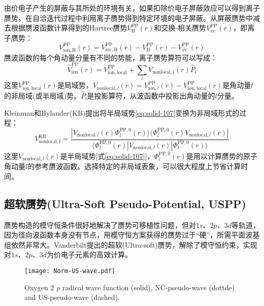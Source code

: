 由价电子产生的屏蔽与其所处的环境有关，如果扣除价电子屏蔽效应可以得到离子赝势。在自洽迭代过程中利用离子赝势得到特定环境的电子屏蔽。从屏蔽赝势中减去根据赝波函数计算得到的Hartree赝势$V_{\mathrm{H}}^{\mathrm{PP}}(r)$和交换-相关赝势$V_{xc}^{\mathrm{PP}}(r)$，即离子赝势\cite{PRB43-1993_1991}：
$$V_{\mathrm{ion},\mathrm{H}}^{\mathrm{PP}}(r)=V_{\mathrm{src},\mathrm{H}}^{\mathrm{PP}}(r)-V_{\mathrm{H}}^{\mathrm{PP}}(r)-V_{xc}^{\mathrm{PP}}(r)$$
赝波函数的每个角动量分量有不同的势能，离子赝势算符可以写成：
\begin{equation}
	\hat V_{\mathrm{ion}}^{\mathrm{PP}}(r)=V_{\mathrm{ion},\mathrm{local}}^{\mathrm{PP}}+\sum_lV_{\mathrm{nonlocal},l}(r)\hat P_l
  \label{eq:solid-107}
\end{equation}
这里$V_{\mathrm{ion},\mathrm{local}}^{\mathrm{PP}}(r)$是局域势，$V_{\mathrm{nonlocal},l}(r)=V_{\mathrm{ion},l}^{\mathrm{PP}}(r)-V_{\mathrm{ion},\mathrm{local}}^{\mathrm{PP}}(r)$是角动量$l$的非局域(或半局域)势。$\hat P_l$是投影算符，从波函数中投影出角动量的$l$分量。

Kleinman和Bylander(KB)\cite{PRL48-1425_1982}提出将半局域势\eqref{eq:solid-107}变换为非局域形式的过程：
$$V_{\mathrm{nonlocal},l}^{\mathrm{KB}}=\dfrac{|V_{\mathrm{nonlocal},l}(r)\Phi_l^{\mathrm{PP},0}(r)\rangle\langle\Phi_l^{\mathrm{PP},0}(r)V_{\mathrm{nonlocal},l}(r)|}{\langle\Phi_l^{\mathrm{PP},0}(r)|V_{\mathrm{nonlocal},l}(r)|\Phi_l^{\mathrm{PP},0}(r)\rangle}$$
这里$V_{\mathrm{nonlocal},l}(r)$是半局域势[式\eqref{eq:solid-107}]，$\Phi_l^{\mathrm{PP},0}(r)$是用以计算赝势的原子角动量$l$的参考赝波函数。选择特定的非局域表象，可以很大程度上节省计算时间。

\subsection{超软赝势\textrm{(Ultra-Soft Pseudo-Potential, USPP)}}
赝势构造的模守恒条件很好地解决了赝势可移植性问题，但对$1s$、$2p$、$3d$等轨道，因为径向波函数本身没有节点，用模守恒方案获得的赝势过于“硬”，所需平面波基组依然非常大。\textrm{Vanderbilt}提出的超软\textrm{(Ultra-soft)}赝势\cite{PRB41-7892_1990}，解除了模守恒约束，实现对$1s$、$2p$、$3d$为价电子元素的高效计算。
\begin{figure}[h!]
\centering
\texttt{[image: Norm-US-wave.pdf]}
\caption{\small \textrm{Oxygen 2} \textit{p} \textrm{radical wave function (solid), NC-pseudo-wave (dottde) and US-pseudo-wave (dashed).}}%
\label{Norm-US-wave}
\end{figure}

